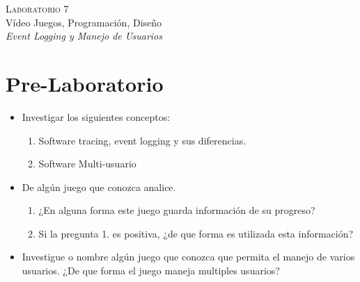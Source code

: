 \begin{center}
\textsc{\Large Laboratorio 7}~\\
{\large Vídeo Juegos, Programación, Diseño}~\\
\emph{Event Logging y Manejo de Usuarios}
\end{center}

\section{Pre-Laboratorio}
\begin{itemize}
\item Investigar los siguientes conceptos:
\begin{enumerate}
  \item Software tracing, event logging y sus diferencias.
  \item Software Multi-usuario
\end{enumerate}
\item De algún juego que conozca analice.
\begin{enumerate}
  \item ¿En alguna forma este juego guarda información de su progreso?
  \item Si la pregunta 1. es positiva, ¿de que forma es utilizada esta información?
\end{enumerate}
\item Investigue o nombre algún juego que conozca que permita el manejo de varios usuarios. ¿De que forma el juego maneja multiples usuarios?
\end{itemize}


